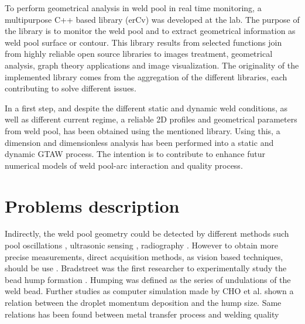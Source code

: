 To perform geometrical analysis in weld pool in real time monitoring, a multipurpose
 C++ based library (erCv) was developed at the lab. 
The purpose of the library is to monitor the weld pool and to extract geometrical 
information as weld pool surface or contour.
This library results from
 selected functions join from highly reliable open source
 libraries to images treatment, geometrical analysis, 
graph theory applications and image visualization.
The originality of the implemented library comes from 
the aggregation of the different libraries, each contributing to solve different
issues.

In a first step, and despite the different static and dynamic 
weld conditions, as well as different current regime, a 
reliable 2D profiles and geometrical parameters from weld
 pool, has been obtained using the mentioned library. 
Using this, a dimension and dimensionless analysis has 
been performed into a static and dynamic GTAW process. 
The intention is to contribute to enhance futur numerical
 models of weld pool-arc interaction and quality process.



\section{Problems description}
\label{problem_description}

Indirectly, the weld pool geometry could be detected 
by different methods such pool oscillations \cite{RENWICK}, 
ultrasonic sensing \cite{CARLSON}, radiography \cite{ROKHLIN}.
 However to obtain more precise measurements, direct 
acquisition methods, as vision based techniques, should 
be use \cite{KOVACEVIC}.     Bradstreet was the first 
researcher to experimentally study the bead hump formation
 \cite{CHO}. Humping was defined as the series of 
undulations of the weld bead. Further studies as computer
 simulation made by CHO et al. \cite{CHO} shown a relation
 between the droplet momentum deposition and the hump size.
 Same relations has been found between metal transfer process
 and welding quality \cite{}

